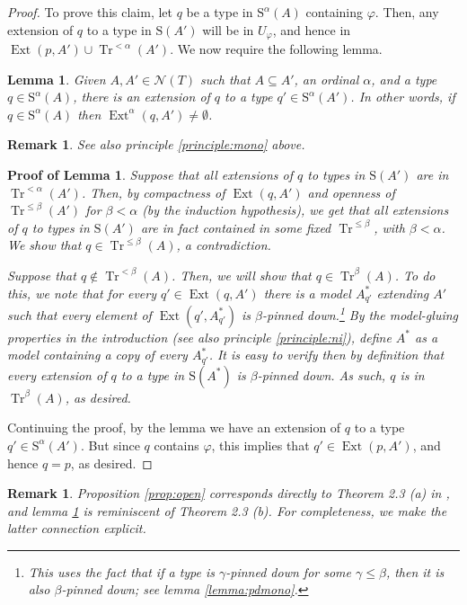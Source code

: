 \documentclass{article}
\newtheorem{lemma}[theorem]{Lemma}
\newtheorem{remark}[theorem]{Remark}
\theoremstyle{nonumberplain}
\newtheorem{proof}{Proof}
\newtheorem{lemmaproof}{Proof of Lemma}
\newcommand{\calN}{\mathcal{N}}
\newcommand{\Stone}{\mathrm{S}}
\DeclareMathOperator{\Tr}{Tr}
\DeclareMathOperator{\Ext}{Ext}
\begin{document}
\begin{proof}
To prove this claim, let $q$ be a type in $\Stone^\alpha(A)$ containing $\varphi$. Then, any extension of $q$ to a type in $\Stone(A')$ will be in $U_\varphi$, and hence in $\Ext(p,A') \cup \Tr^{<\alpha}(A')$. We now require the following lemma.

\begin{lemma}\label{lemma:ext}
Given $A, A' \in \calN(T)$ such that $A \subseteq A'$, an ordinal $\alpha$, and a type $q \in \Stone^\alpha(A)$, there is an extension of $q$ to a type $q' \in \Stone^\alpha(A')$. In other words, if $q \in \Stone^\alpha(A)$ then $\Ext^\alpha(q,A') \neq \emptyset$.
\end{lemma}

\begin{remark}
See also principle \ref{principle:mono} above.
\end{remark}

\begin{lemmaproof}
Suppose that all extensions of $q$ to types in $\Stone(A')$ are in $\Tr^{<\alpha}(A')$. Then, by compactness of $\Ext(q,A')$ and openness of $\Tr^{\leq \beta}(A')$ for $\beta < \alpha$ (by the induction hypothesis), we get that all extensions of $q$ to types in $\Stone(A')$ are in fact contained in some fixed $\Tr^{\leq \beta}$, with $\beta < \alpha$. We show that $q \in \Tr^{\leq \beta}(A)$, a contradiction.

Suppose that $q \not\in \Tr^{<\beta}(A)$. Then, we will show that $q \in \Tr^\beta(A)$. To do this, we note that for every $q' \in \Ext(q,A')$ there is a model $A^*_{q'}$ extending $A'$ such that every element of $\Ext(q',A^*_{q'})$ is $\beta$-pinned down.\footnote{This uses the fact that if a type is $\gamma$-pinned down for some $\gamma \leq \beta$, then it is also $\beta$-pinned down; see lemma \ref{lemma:pdmono}.} By the model-gluing properties in the introduction (see also principle \ref{principle:ni}), define $A^*$ as a model containing a copy of every $A^*_{q'}$. It is easy to verify then by definition that every extension of $q$ to a type in $\Stone(A^*)$ is $\beta$-pinned down. As such, $q$ is in $\Tr^\beta(A)$, as desired.
\end{lemmaproof}

Continuing the proof, by the lemma we have an extension of $q$ to a type $q' \in \Stone^\alpha(A')$. But since $q$ contains $\varphi$, this implies that $q' \in \Ext(p,A')$, and hence $q = p$, as desired.
\end{proof}

\begin{remark}
Proposition \ref{prop:open} corresponds directly to Theorem 2.3 (a) in \cite{morley}, and lemma \ref{lemma:ext} is reminiscent of Theorem 2.3 (b). For completeness, we make the latter connection explicit.
\end{remark}
\end{document}
